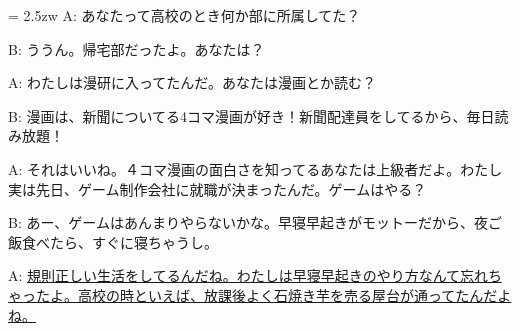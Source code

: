 \documentclass[11pt]{amsart}
\title{}
\author{}
\newenvironment{hangall}[1]{\hangindent = 2.5zw\everypar{\hangindent = 2.5zw}}{}
\begin{document}
\maketitle
\begin{hangall}{}%
A: あなたって高校のとき何か部に所属してた？

B: ううん。帰宅部だったよ。あなたは？

A: わたしは漫研に入ってたんだ。あなたは漫画とか読む？

B: 漫画は、新聞についてる4コマ漫画が好き！新聞配達員をしてるから、毎日読み放題！

A: それはいいね。４コマ漫画の面白さを知ってるあなたは上級者だよ。わたし実は先日、ゲーム制作会社に就職が決まったんだ。ゲームはやる？

B: あー、ゲームはあんまりやらないかな。早寝早起きがモットーだから、夜ご飯食べたら、すぐに寝ちゃうし。

A: \ul{規則正しい生活をしてるんだね。わたしは早寝早起きのやり方なんて忘れちゃったよ。高校の時といえば、放課後よく石焼き芋を売る屋台が通ってたんだよね。}\end{hangall}
\end{document}
